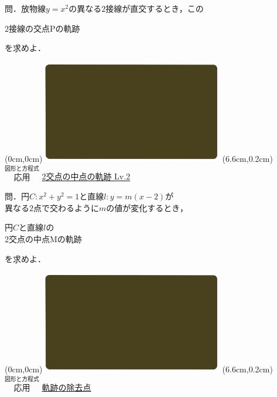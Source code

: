 \documentclass[10pt,
fleqn,
dvipdfmx,
uplatex
]{jsarticle}
\begin{document}
\Large
問．放物線$y=x^2$の異なる$2$接線が直交するとき，この

\huge
\hspace{0.5zw}$2$接線の交点$\text{P}$の軌跡

\Large
\hfill を求めよ．

\newpage

\at(0cm,0cm){\includegraphics[width=8cm,bb=0 0 1920 1080]{./youtube/thumbnails/templates/smart_background/図形と方程式.jpeg}}
\at(6.6cm,0.2cm){\small\color{bradorange}$\overset{\text{図形と方程式}}{\text{応用}}$}
{\color{orange}\Large\underline{2交点の中点の軌跡 Lv.2}}\vspace{0.3zw}

\small 
問．円$C:x^2+y^2=1$と直線$l:y=m\left(x-2\right)$が\\
\hspace{0.2zw}異なる$2$点で交わるように$m$の値が変化するとき，

\huge
\vspace{-0.2zw}
\hspace{0.2zw}円$C$と直線$l$の\vspace{-0.0zw}\\
\hfill 2交点の中点$\text{M}$の軌跡\hspace{0.4zw}

\small
\vspace{0.2zw}
\hfill を求めよ．

\newpage

\at(0cm,0cm){\includegraphics[width=8cm,bb=0 0 1920 1080]{./youtube/thumbnails/templates/smart_background/図形と方程式.jpeg}}
\at(6.6cm,0.2cm){\small\color{bradorange}$\overset{\text{図形と方程式}}{\text{応用}}$}
{\color{orange}\huge\underline{軌跡の除去点}}\vspace{0.3zw}
\end{document}
